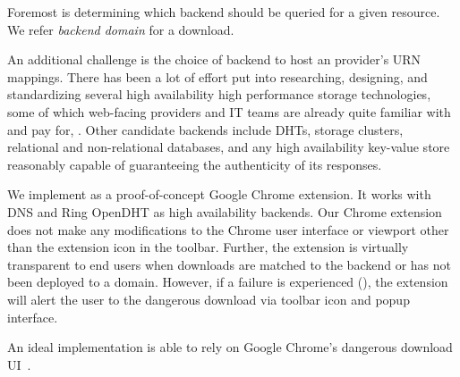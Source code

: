 Foremost is determining which backend should be queried for a
given resource. We refer \emph{backend domain} for a download. 

An additional challenge is the choice of backend to host an provider's URN
mappings. There has been a lot of effort put into researching, designing, and
standardizing several high availability high performance storage technologies,
some of which web-facing providers and IT teams are already quite familiar with
and pay for, . Other candidate backends include
DHTs, storage clusters, relational and non-relational databases, and any high
availability key-value store reasonably capable of guaranteeing the authenticity
of its responses.

We implement \SYSTEM{} as a proof-of-concept Google Chrome extension. It works
with DNS and Ring OpenDHT as high availability backends. Our Chrome extension
does not make any modifications to the Chrome user interface or viewport other
than the extension icon in the toolbar. Further, the extension is virtually
transparent to end users when downloads are matched to the backend or \SYSTEM{}
has not been deployed to a domain. However, if a failure is experienced (), the extension will alert the user to the dangerous download via
toolbar icon and popup interface.


An ideal implementation is able to rely on Google Chrome's dangerous download
UI~\cite{ChromeClickThrough}.
